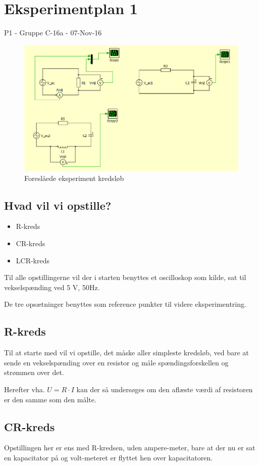 \documentclass[a4paper,11pt]{memoir}
\begin{document}
\chapter{Eksperimentplan 1}
P1 - Gruppe C-16a - 07-Nov-16

\begin{figure}[htbp]
\centering
\includegraphics[width=1.2\textwidth]{schematics/Eks1_LCR.png}
\caption{Foreslåede eksperiment kredsløb}
\label{fig:Eks1}
\end{figure}
\newpage

\section{Hvad vil vi opstille?}
\begin{itemize}
\item R-kreds
\item CR-kreds
\item LCR-kreds
\end{itemize}
Til alle opstillingerne vil der i starten benyttes et oscilloskop som kilde, sat til vekselspænding ved 5 V, 50Hz.

De tre opsætninger benyttes som reference punkter til videre eksperimentring.  
\section{R-kreds}
Til at starte med vil vi opstille, det måske aller simpleste kredsløb, ved bare at sende en vekselspænding over en resistor og måle spændingsforskellen og strømmen over det.

Herefter vha. $U=R\cdot I$ kan der så undersøges om den aflæste værdi af resistoren er den samme som den målte.
\section{CR-kreds}
Opstillingen her er ens med R-kredsen, uden ampere-meter, bare at der nu er sat en kapacitator på og volt-meteret er flyttet hen over kapacitatoren.
\end{document}
